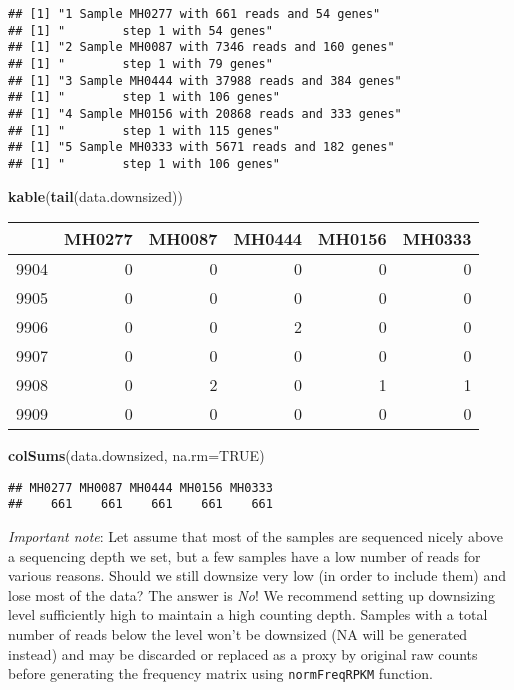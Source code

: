 \documentclass[]{article}
\newenvironment{Shaded}{\begin{snugshade}}{\end{snugshade}}
\newcommand{\KeywordTok}[1]{\textcolor[rgb]{0.13,0.29,0.53}{\textbf{{#1}}}}
\newcommand{\DataTypeTok}[1]{\textcolor[rgb]{0.13,0.29,0.53}{{#1}}}
\newcommand{\OtherTok}[1]{\textcolor[rgb]{0.56,0.35,0.01}{{#1}}}
\newcommand{\NormalTok}[1]{{#1}}
\begin{document}
\begin{verbatim}
## [1] "1 Sample MH0277 with 661 reads and 54 genes"
## [1] "        step 1 with 54 genes"
## [1] "2 Sample MH0087 with 7346 reads and 160 genes"
## [1] "        step 1 with 79 genes"
## [1] "3 Sample MH0444 with 37988 reads and 384 genes"
## [1] "        step 1 with 106 genes"
## [1] "4 Sample MH0156 with 20868 reads and 333 genes"
## [1] "        step 1 with 115 genes"
## [1] "5 Sample MH0333 with 5671 reads and 182 genes"
## [1] "        step 1 with 106 genes"
\end{verbatim}

\begin{Shaded}
\begin{Highlighting}[]
\KeywordTok{kable}\NormalTok{(}\KeywordTok{tail}\NormalTok{(data.downsized))}
\end{Highlighting}
\end{Shaded}

\begin{longtable}[c]{@{}lrrrrr@{}}
\toprule
& MH0277 & MH0087 & MH0444 & MH0156 & MH0333\tabularnewline
\midrule
\endhead
9904 & 0 & 0 & 0 & 0 & 0\tabularnewline
9905 & 0 & 0 & 0 & 0 & 0\tabularnewline
9906 & 0 & 0 & 2 & 0 & 0\tabularnewline
9907 & 0 & 0 & 0 & 0 & 0\tabularnewline
9908 & 0 & 2 & 0 & 1 & 1\tabularnewline
9909 & 0 & 0 & 0 & 0 & 0\tabularnewline
\bottomrule
\end{longtable}

\begin{Shaded}
\begin{Highlighting}[]
\KeywordTok{colSums}\NormalTok{(data.downsized, }\DataTypeTok{na.rm=}\OtherTok{TRUE}\NormalTok{)}
\end{Highlighting}
\end{Shaded}

\begin{verbatim}
## MH0277 MH0087 MH0444 MH0156 MH0333 
##    661    661    661    661    661
\end{verbatim}

\emph{Important note}: Let assume that most of the samples are sequenced
nicely above a sequencing depth we set, but a few samples have a low
number of reads for various reasons. Should we still downsize very low
(in order to include them) and lose most of the data? The answer is
\emph{No}! We recommend setting up downsizing level sufficiently high to
maintain a high counting depth. Samples with a total number of reads
below the level won't be downsized (NA will be generated instead) and
may be discarded or replaced as a proxy by original raw counts before
generating the frequency matrix using \texttt{normFreqRPKM} function.
\end{document}
